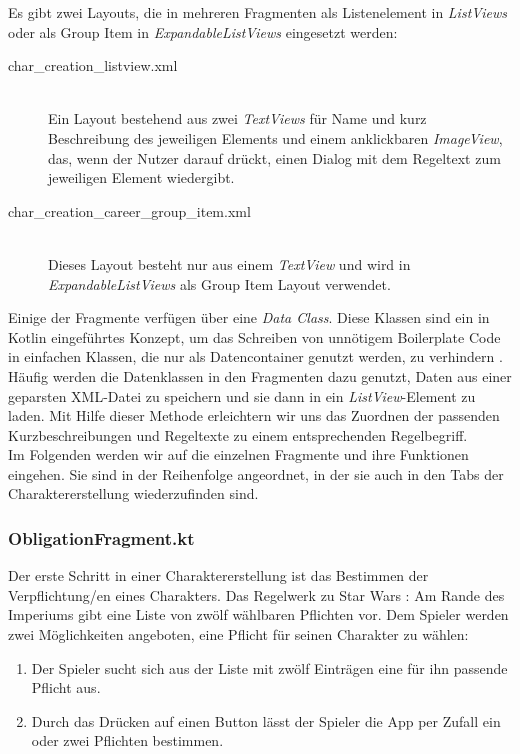 Es gibt zwei Layouts, die in mehreren Fragmenten als Listenelement in \textit{ListViews} oder als Group Item in \textit{ExpandableListViews} eingesetzt werden:
\begin{description}
\item[char\_creation\_listview.xml]\mbox{}\\
Ein Layout bestehend aus zwei \textit{TextViews} für Name und kurz Beschreibung des jeweiligen Elements und einem anklickbaren \textit{ImageView}, das, wenn der Nutzer darauf drückt, einen Dialog mit dem Regeltext zum jeweiligen Element wiedergibt.
\item[char\_creation\_career\_group\_item.xml]\mbox{}\\
Dieses Layout besteht nur aus einem \textit{TextView} und wird in \textit{ExpandableListViews} als Group Item Layout verwendet.
\end{description}

Einige der Fragmente verfügen über eine \textit{Data Class}. Diese Klassen sind ein in Kotlin eingeführtes Konzept, um das Schreiben von unnötigem \grqq Boilerplate Code\grqq{} in einfachen Klassen, die nur als Datencontainer genutzt werden, zu verhindern \cite{dataclasses}. Häufig werden die Datenklassen in den Fragmenten dazu genutzt, Daten aus einer geparsten XML-Datei zu speichern und sie dann in ein \textit{ListView}-Element zu laden. Mit Hilfe dieser Methode erleichtern wir uns das Zuordnen der passenden Kurzbeschreibungen und Regeltexte zu einem entsprechenden Regelbegriff.\\

Im Folgenden werden wir auf die einzelnen Fragmente und ihre Funktionen eingehen. Sie sind in der Reihenfolge angeordnet, in der sie auch in den Tabs der Charaktererstellung  wiederzufinden sind.

\subsubsection{ObligationFragment.kt}
Der erste Schritt in einer Charaktererstellung ist das Bestimmen der Verpflichtung/en eines Charakters. Das Regelwerk zu \glqq Star Wars : Am Rande des Imperiums\grqq{} \cite[39]{rulebook} gibt eine Liste von zwölf wählbaren Pflichten vor. Dem Spieler werden zwei Möglichkeiten angeboten, eine Pflicht für seinen Charakter zu wählen:
\begin{enumerate}
\item Der Spieler sucht sich aus der Liste mit zwölf Einträgen eine für ihn passende Pflicht aus.
\item Durch das Drücken auf einen Button lässt der Spieler die App per Zufall ein oder zwei Pflichten bestimmen.
\end{enumerate}

